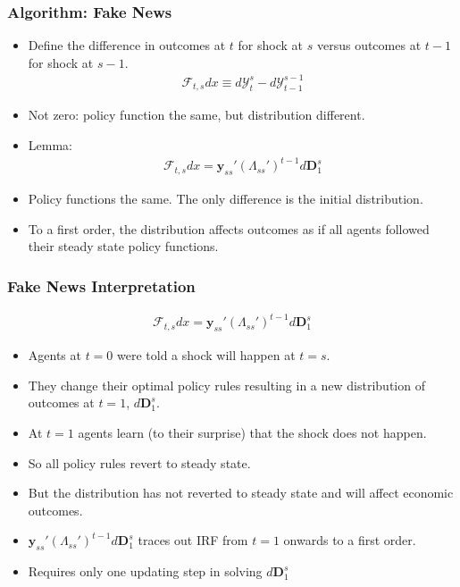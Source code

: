 \documentclass[english,xcolor=svgnames]{beamer}
\begin{document}
\begin{frame}
    \frametitle{Algorithm: Fake News}
    \begin{itemize}
        \item Define the difference in outcomes at $t$ for shock at $s$ versus outcomes at $t-1$ for shock at $s-1$.
        \begin{align*}
        	\mathcal{F}_{t,s}dx \equiv d\mathcal{Y}_{t}^{s} - d\mathcal{Y}_{t-1}^{s-1}
        \end{align*}
        \item Not zero: policy function the same, but distribution different.
        \item Lemma:
        \begin{align*}
        	\mathcal{F}_{t,s}dx = \bm{y}_{ss}' (\Lambda_{ss}')^{t-1}d\bm{D}_1^s
        \end{align*}
        \item Policy functions the same. The only difference is the initial distribution.
        \item To a first order, the distribution affects outcomes as if all agents followed their steady state policy functions.
	\end{itemize}
\end{frame}

\begin{frame}
    \frametitle{Fake News Interpretation}
     \begin{align*}
        	\mathcal{F}_{t,s}dx = \bm{y}_{ss}' (\Lambda_{ss}')^{t-1}d\bm{D}_1^s
        \end{align*}
    \begin{itemize}
        \item Agents at $t=0$ were told a shock will happen at $t=s$.
        \item They change their optimal policy rules resulting in a new distribution of outcomes at $t=1$, $d\bm{D}_1^s$.
        \item At $t=1$ agents learn (to their surprise) that the shock does not happen.
        \item So all policy rules revert to steady state.
        \item But the distribution has not reverted to steady state and will affect economic outcomes.
        \item $\bm{y}_{ss}' (\Lambda_{ss}')^{t-1}d\bm{D}_1^s$ traces out IRF from $t=1$ onwards to a first order.
        \item Requires only one updating step in solving $d\bm{D}_1^s$
	\end{itemize}
\end{frame}
\end{document}
